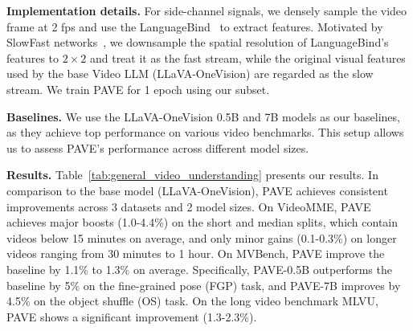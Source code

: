 \medskip
\noindent\textbf{Implementation details.} For side-channel signals, we densely sample the video frame at 2 fps and use the LanguageBind~\cite{zhu2023languagebind} to extract features. Motivated by SlowFast networks~\cite{feichtenhofer2019slowfastnetworksvideorecognition}, we downsample the spatial resolution of LanguageBind's features to $2 \times 2$ and treat it as the fast stream, while the original visual features used by the base Video LLM (LLaVA-OneVision) are regarded as the slow stream. 
We 
train PAVE for 1 epoch using our subset.

\medskip
\noindent\textbf{Baselines.}
We use the LLaVA-OneVision 0.5B and 7B models as our baselines, as they achieve top performance on various video benchmarks. This setup allows us to assess PAVE's performance across different model sizes.

\medskip
\noindent\textbf{Results.} Table~\ref{tab:general_video_understanding} presents our results. In comparison to the base model (LLaVA-OneVision), PAVE achieves consistent improvements across 3 datasets and 2 model sizes. 
On VideoMME, PAVE achieves major boosts (1.0-4.4\%) on the short and median splits, which contain videos below 15 minutes on average, and only minor gains (0.1-0.3\%) on longer videos ranging from 30 minutes to 1 hour. 
%
On MVBench, PAVE improve the baseline by 1.1\% to 1.3\% on average. Specifically, PAVE-0.5B outperforms the baseline by 5\% on the fine-grained pose (FGP) task, and PAVE-7B improves by 4.5\% on the object shuffle (OS) task.
%
On the long video benchmark MLVU, PAVE shows a significant improvement (1.3-2.3\%). 





